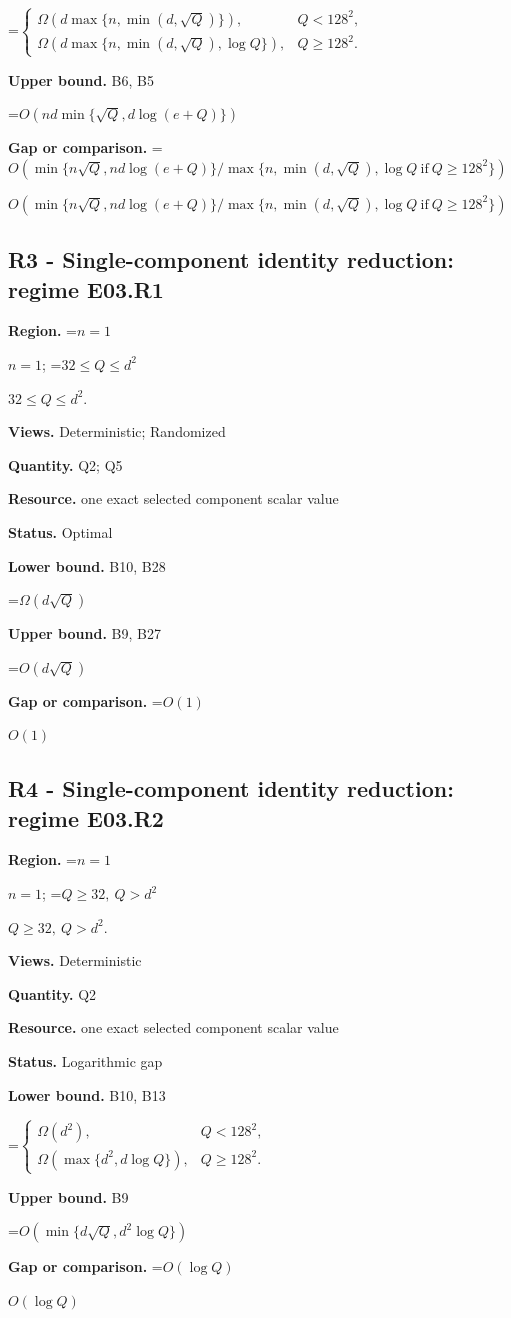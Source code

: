 \documentclass[10pt,a4paper]{article}
\newcommand{\AtlasMath}[1]{\par\begingroup\centering\setbox0=\hbox{$\displaystyle #1$}\ifdim\wd0>1.4\linewidth\typeout{ATLAS WIDE FORMULA: \the\wd0}\fi\ifdim\wd0>\linewidth\resizebox{\linewidth}{!}{\box0}\else\box0\fi\par\endgroup}
\newcommand{\AtlasInlineMath}[1]{\begingroup\setbox0=\hbox{$#1$}\ifdim\wd0>.4\linewidth\endgroup\AtlasMath{#1}\else\endgroup$#1$\fi}
\begin{document}
\AtlasMath{\begin{cases}\Omega(d\max\{n,\min(d,\sqrt Q)\}),&Q<128^2,\\\Omega(d\max\{n,\min(d,\sqrt Q),\log Q\}),&Q\ge128^2.\end{cases}}
\textbf{Upper bound.} B6, B5

\AtlasMath{O(nd\min\{\sqrt Q,d\log(e+Q)\})}
\textbf{Gap or comparison.} \AtlasInlineMath{O(\min\{n\sqrt Q,nd\log(e+Q)\}/\max\{n,\min(d,\sqrt Q),\log Q\ \mathrm{if}\ Q\ge128^2\})}

\subsection{R3 - Single-component identity reduction: regime E03.R1}
\textbf{Region.} \AtlasInlineMath{n=1}; \AtlasInlineMath{32\le Q\le d^2}.

\textbf{Views.} Deterministic; Randomized

\textbf{Quantity.} Q2; Q5

\textbf{Resource.} one exact selected component scalar value

\textbf{Status.} Optimal

\textbf{Lower bound.} B10, B28

\AtlasMath{\Omega(d\sqrt Q)}
\textbf{Upper bound.} B9, B27

\AtlasMath{O(d\sqrt Q)}
\textbf{Gap or comparison.} \AtlasInlineMath{O(1)}

\subsection{R4 - Single-component identity reduction: regime E03.R2}
\textbf{Region.} \AtlasInlineMath{n=1}; \AtlasInlineMath{Q\ge32,\ Q>d^2}.

\textbf{Views.} Deterministic

\textbf{Quantity.} Q2

\textbf{Resource.} one exact selected component scalar value

\textbf{Status.} Logarithmic gap

\textbf{Lower bound.} B10, B13

\AtlasMath{\begin{cases}\Omega(d^2),&Q<128^2,\\\Omega(\max\{d^2,d\log Q\}),&Q\ge128^2.\end{cases}}
\textbf{Upper bound.} B9

\AtlasMath{O(\min\{d\sqrt Q,d^2\log Q\})}
\textbf{Gap or comparison.} \AtlasInlineMath{O(\log Q)}
\end{document}
